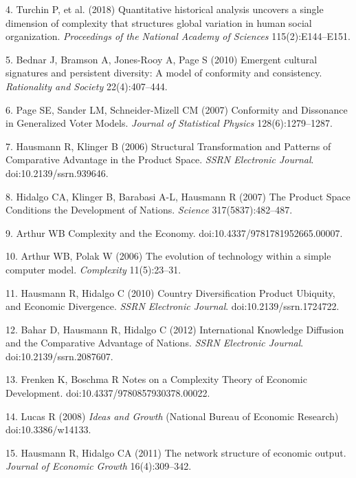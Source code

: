 \documentclass{pnastwo}
\begin{document}
\begin{article}
\label{csl:4}4. Turchin P, et al. (2018) {Quantitative historical analysis uncovers a single dimension of complexity that structures global variation in human social organization}. \textit{Proceedings of the National Academy of Sciences} 115(2):E144–E151.

\label{csl:5}5. Bednar J, Bramson A, Jones-Rooy A, Page S (2010) {Emergent cultural signatures and persistent diversity: A model of conformity and consistency}. \textit{Rationality and Society} 22(4):407–444.

\label{csl:6}6. Page SE, Sander LM, Schneider-Mizell CM (2007) {Conformity and Dissonance in Generalized Voter Models}. \textit{Journal of Statistical Physics} 128(6):1279–1287.

\label{csl:7}7. Hausmann R, Klinger B (2006) {Structural Transformation and Patterns of Comparative Advantage in the Product Space}. \textit{{SSRN} Electronic Journal}. doi:10.2139/ssrn.939646.

\label{csl:8}8. Hidalgo CA, Klinger B, Barabasi A-L, Hausmann R (2007) {The Product Space Conditions the Development of Nations}. \textit{Science} 317(5837):482–487.

\label{csl:9}9. Arthur WB {Complexity and the Economy}. doi:10.4337/9781781952665.00007.

\label{csl:10}10. Arthur WB, Polak W (2006) {The evolution of technology within a simple computer model}. \textit{Complexity} 11(5):23–31.

\label{csl:11}11. Hausmann R, Hidalgo C (2010) {Country Diversification Product Ubiquity, and Economic Divergence}. \textit{{SSRN} Electronic Journal}. doi:10.2139/ssrn.1724722.

\label{csl:12}12. Bahar D, Hausmann R, Hidalgo C (2012) {International Knowledge Diffusion and the Comparative Advantage of Nations}. \textit{{SSRN} Electronic Journal}. doi:10.2139/ssrn.2087607.

\label{csl:13}13. Frenken K, Boschma R {Notes on a Complexity Theory of Economic Development}. doi:10.4337/9780857930378.00022.

\label{csl:14}14. Lucas R (2008) \textit{{Ideas and Growth}} (National Bureau of Economic Research) doi:10.3386/w14133.

\label{csl:15}15. Hausmann R, Hidalgo CA (2011) {The network structure of economic output}. \textit{Journal of Economic Growth} 16(4):309–342.


\end{article}
\end{document}

